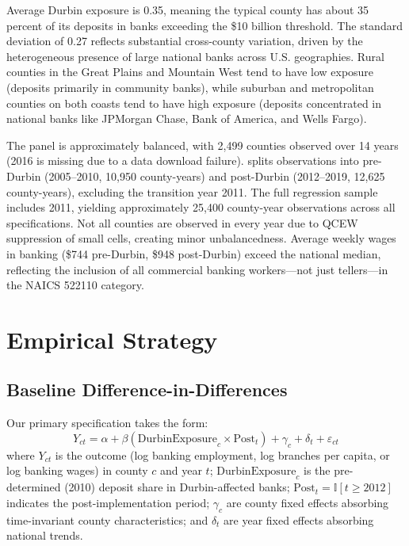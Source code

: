 \documentclass[12pt]{article}
\newcommand{\ind}{\mathbb{I}}
\begin{document}
Average Durbin exposure is 0.35, meaning the typical county has about 35 percent of its deposits in banks exceeding the \$10 billion threshold. The standard deviation of 0.27 reflects substantial cross-county variation, driven by the heterogeneous presence of large national banks across U.S. geographies. Rural counties in the Great Plains and Mountain West tend to have low exposure (deposits primarily in community banks), while suburban and metropolitan counties on both coasts tend to have high exposure (deposits concentrated in national banks like JPMorgan Chase, Bank of America, and Wells Fargo).

The panel is approximately balanced, with 2,499 counties observed over 14 years (2016 is missing due to a data download failure).  splits observations into pre-Durbin (2005--2010, 10,950 county-years) and post-Durbin (2012--2019, 12,625 county-years), excluding the transition year 2011. The full regression sample includes 2011, yielding approximately 25,400 county-year observations across all specifications. Not all counties are observed in every year due to QCEW suppression of small cells, creating minor unbalancedness. Average weekly wages in banking (\$744 pre-Durbin, \$948 post-Durbin) exceed the national median, reflecting the inclusion of all commercial banking workers---not just tellers---in the NAICS 522110 category.


\section{Empirical Strategy}\label{sec:strategy}

\subsection{Baseline Difference-in-Differences}

Our primary specification takes the form:
\begin{equation}\label{eq:did}
Y_{ct} = \alpha + \beta (\text{DurbinExposure}_c \times \text{Post}_t) + \gamma_c + \delta_t + \varepsilon_{ct}
\end{equation}
where $Y_{ct}$ is the outcome (log banking employment, log branches per capita, or log banking wages) in county $c$ and year $t$; $\text{DurbinExposure}_c$ is the pre-determined (2010) deposit share in Durbin-affected banks; $\text{Post}_t = \ind[t \geq 2012]$ indicates the post-implementation period; $\gamma_c$ are county fixed effects absorbing time-invariant county characteristics; and $\delta_t$ are year fixed effects absorbing national trends.
\end{document}
